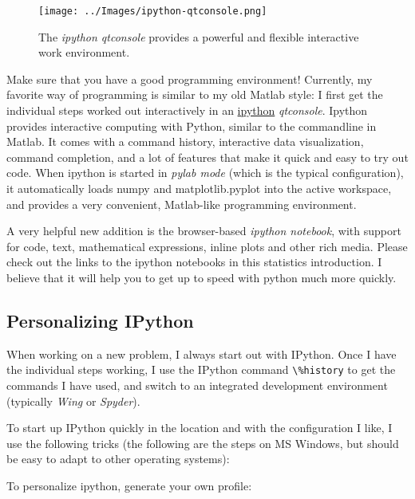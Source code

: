 \begin{figure}
  \centering
  \texttt{[image: ../Images/ipython-qtconsole.png]}\\
  \caption{The \emph{ipython qtconsole} provides a powerful and flexible interactive work environment.}
\end{figure}

Make sure that you have a good programming environment! Currently, my favorite way of programming is
similar to my old Matlab style: I first get the individual steps worked out interactively in an
\href{http://ipython.org/}{ipython} \emph{qtconsole}. Ipython  provides interactive computing with Python, similar to the commandline in Matlab. It comes with a command history, interactive data visualization, command completion, and a lot of features that make it quick and easy to try out code. When ipython is started in \emph{pylab mode} (which is the typical configuration), it automatically loads numpy and matplotlib.pyplot into the active workspace, and provides a very convenient, Matlab-like programming environment.

A very helpful new addition is the browser-based \emph{ipython notebook}, with support for code, text, mathematical expressions, inline plots and other rich media. Please check out the links to the ipython
notebooks in this statistics introduction. I believe that it will  help you to get up to speed with python much more quickly.

\subsection{Personalizing IPython}

When working on a new problem, I always start out with IPython. Once I have the individual steps working, I use the IPython command \lstinline{\%history} to get the commands I have used, and switch to an integrated development environment (typically \emph{Wing} or \emph{Spyder}).

To start up IPython quickly in the location and with the configuration I like, I use the following tricks (the following are the steps on MS Windows, but should be easy to adapt to other operating systems):

To personalize ipython, generate your own profile:

